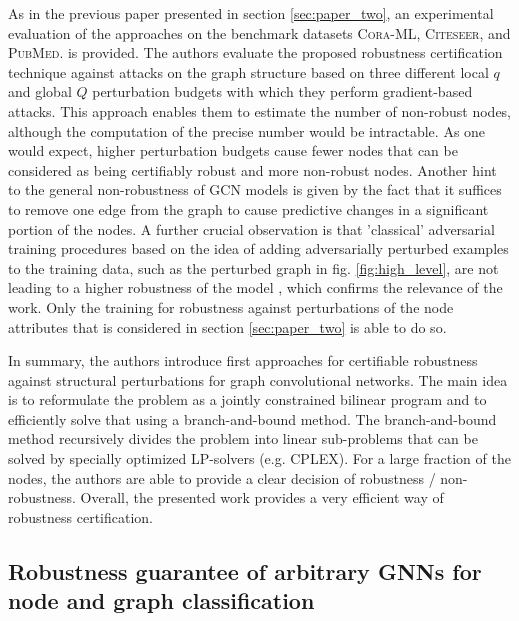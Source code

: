 \documentclass[a4paper,preprint]{sig-alternate}
\begin{document}
As in the previous paper presented in section \ref{sec:paper_two}, an experimental evaluation of the approaches on the benchmark datasets 
\textsc{Cora-ML}, \textsc{Citeseer}, and \textsc{PubMed}. is provided.
The authors evaluate the proposed robustness certification technique against attacks on the graph structure
based on three different local $q$ and global $Q$ perturbation budgets with which they perform gradient-based attacks.
This approach enables them to estimate the number of non-robust nodes, although the computation of the precise number would be intractable. \cite{10.1145/3394486.3403217}
As one would expect, higher perturbation budgets cause fewer nodes that can be considered as being certifiably robust and 
more non-robust nodes. \cite{10.1145/3394486.3403217}
Another hint to the general non-robustness of GCN models is given by the fact that it suffices to remove one edge from the graph
to cause predictive changes in a significant portion of the nodes. \cite{10.1145/3394486.3403217}
A further crucial observation is that 'classical' adversarial training procedures based on the idea of adding adversarially
perturbed examples to the training data, such as the perturbed graph in fig. \ref{fig:high_level}, are not leading to a higher robustness
of the model \cite{10.1145/3394486.3403217}, which confirms the relevance of the work.
Only the training for robustness against perturbations of the node attributes that is considered in section \ref{sec:paper_two} is able to do so.\newline

In summary, the authors introduce first approaches for certifiable robustness against structural perturbations for graph convolutional networks.
The main idea is to reformulate the problem as a jointly constrained bilinear program and to efficiently solve that using a branch-and-bound
method. The branch-and-bound method recursively divides the problem into linear sub-problems that can be solved by specially optimized LP-solvers (e.g. CPLEX).
For a large fraction of the nodes, the authors are able to provide a clear decision of robustness / non-robustness.
Overall, the presented work provides a very efficient way of robustness certification.

\subsection{Robustness guarantee of arbitrary GNNs for node and graph classification}
\label{sec:paper_four}
\end{document}
